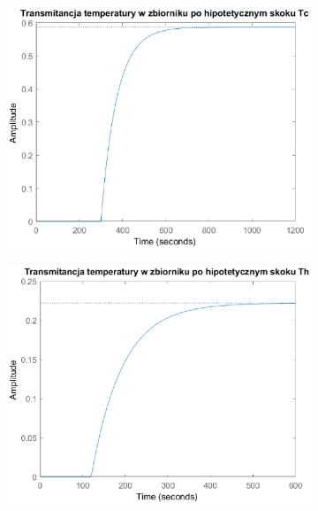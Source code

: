 \begin{figure}[h!]
   \centering
   \begin{subfigure}[b]{0.6\textwidth}
      \includegraphics[width=1\linewidth]{img/transforms/transformTTc.eps}
      \caption{}
      \label{fig:fig:transformTT1}
   \end{subfigure}
       
   \begin{subfigure}[b]{0.6\textwidth}
      \includegraphics[width=1\linewidth]{img/transforms/transformTTh.eps}
      \caption{}
      \label{fig:fig:transformTT2}
   \end{subfigure}
       

\end{figure}

